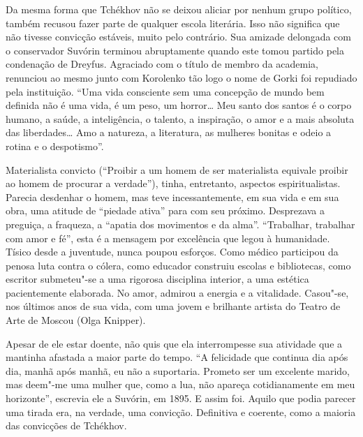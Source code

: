 Da mesma forma que Tchékhov não se deixou aliciar por nenhum grupo
político, também recusou fazer parte de qualquer escola literária. Isso
não significa que não tivesse convicção estáveis, muito pelo contrário.
Sua amizade delongada com o conservador Suvórin terminou abruptamente
quando este tomou partido pela condenação de Dreyfus. Agraciado com o
título de membro da academia, renunciou ao mesmo junto com Korolenko tão
logo o nome de Gorki foi repudiado pela instituição. ``Uma vida
consciente sem uma concepção de mundo bem definida não é uma vida, é um
peso, um horror\ldots{} Meu santo dos santos é o corpo humano, a saúde, a
inteligência, o talento, a inspiração, o amor e a mais absoluta das
liberdades\ldots{} Amo a natureza, a literatura, as mulheres bonitas e odeio
a rotina e o despotismo''.

Materialista convicto (``Proibir a um homem de ser materialista equivale
proibir ao homem de procurar a verdade''), tinha, entretanto, aspectos
espiritualistas. Parecia desdenhar o homem, mas teve incessantemente, em
sua vida e em sua obra, uma atitude de ``piedade ativa'' para com seu
próximo. Desprezava a preguiça, a fraqueza, a ``apatia dos movimentos e
da alma''. ``Trabalhar, trabalhar com amor e fé'', esta é a mensagem por
excelência que legou à humanidade. Tísico desde a juventude, nunca
poupou esforços. Como médico participou da penosa luta contra o cólera,
como educador construiu escolas e bibliotecas, como escritor submeteu"-se
a uma rigorosa disciplina interior, a uma estética pacientemente
elaborada. No amor, admirou a energia e a vitalidade. Casou"-se, nos
últimos anos de sua vida, com uma jovem e brilhante artista do Teatro de
Arte de Moscou (Olga Knipper).

Apesar de ele estar doente, não quis que ela interrompesse sua atividade
que a mantinha afastada a maior parte do tempo. ``A felicidade que
continua dia após dia, manhã após manhã, eu não a suportaria. Prometo
ser um excelente marido, mas deem"-me uma mulher que, como a lua, não
apareça cotidianamente em meu horizonte'', escrevia ele a Suvórin, em
1895. E assim foi. Aquilo que podia parecer uma tirada era, na verdade,
uma convicção. Definitiva e coerente, como a maioria das convicções de
Tchékhov.

